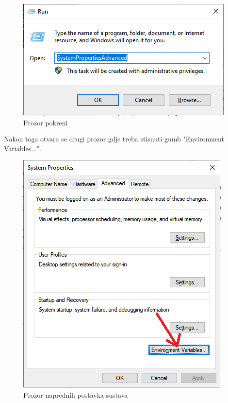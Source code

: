 			\begin{figure}[H]
			\centering
			\includegraphics[width=\textwidth, scale=0.5]{slike/RunWindow}
			\caption{Prozor pokreni}
			\label{fig:RunWindow}
			\end{figure}
			
			Nakon toga otvara se drugi prozor gdje treba stisnuti gumb "Environment Variables...".
			
			\begin{figure}[H]
			\centering
			\includegraphics[width=\textwidth, scale=0.5]{slike/SystemPropertiesAdvanced}
			\caption{Prozor naprednih postavka sustava}
			\label{fig:SystemPropertiesAdvanced}
			\end{figure}
			
